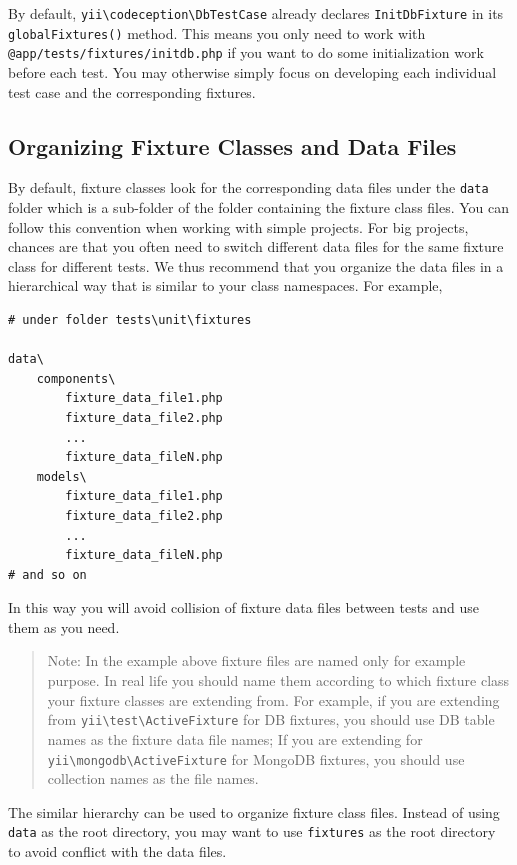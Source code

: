 By default, \texttt{yii{\allowbreak{}\textbackslash}codeception{\allowbreak{}\textbackslash}DbTestCase} already declares \lstinline|InitDbFixture| in its \lstinline|globalFixtures()| method.
This means you only need to work with \lstinline|@app/tests/fixtures/initdb.php| if you want to do some initialization work
before each test. You may otherwise simply focus on developing each individual test case and the corresponding fixtures.

\subsection{Organizing Fixture Classes and Data Files}
By default, fixture classes look for the corresponding data files under the \lstinline|data| folder which is a sub-folder
of the folder containing the fixture class files. You can follow this convention when working with simple projects.
For big projects, chances are that you often need to switch different data files for the same fixture class for
different tests. We thus recommend that you organize the data files in a hierarchical way that is similar to
your class namespaces. For example,

\begin{lstlisting}
# under folder tests\unit\fixtures

data\
    components\
        fixture_data_file1.php
        fixture_data_file2.php
        ...
        fixture_data_fileN.php
    models\
        fixture_data_file1.php
        fixture_data_file2.php
        ...
        fixture_data_fileN.php
# and so on
\end{lstlisting}
In this way you will avoid collision of fixture data files between tests and use them as you need.

\begin{quote}Note: In the example above fixture files are named only for example purpose. In real life you should name them
according to which fixture class your fixture classes are extending from. For example, if you are extending
from \texttt{yii{\allowbreak{}\textbackslash}test{\allowbreak{}\textbackslash}ActiveFixture} for DB fixtures, you should use DB table names as the fixture data file names;
If you are extending for \texttt{yii{\allowbreak{}\textbackslash}mongodb{\allowbreak{}\textbackslash}ActiveFixture} for MongoDB fixtures, you should use collection names as the file names.

\end{quote}
The similar hierarchy can be used to organize fixture class files. Instead of using \lstinline|data| as the root directory, you may
want to use \lstinline|fixtures| as the root directory to avoid conflict with the data files.

